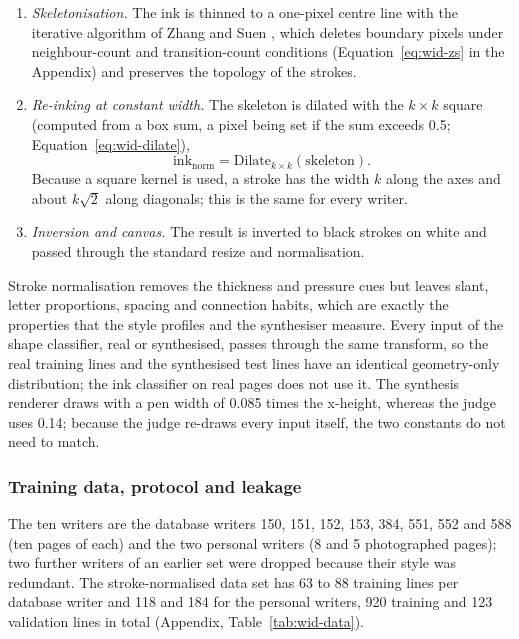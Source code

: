 \begin{enumerate}
\begin{equation}
w=\mathrm{clip}\bigl(\mathrm{round}(0.14\,x_h),\,2,\,9\bigr),\qquad k=2\lfloor w/2\rfloor+1,
\label{eq:wid-penw}
\end{equation}
where $k$ is the odd side of the structuring element that realises the width (for example $x_h=20$ gives $w=3$ and $k=3$).
\item \emph{Skeletonisation.} The ink is thinned to a one-pixel centre line with the iterative algorithm of Zhang and Suen \cite{zhang1984}, which deletes boundary pixels under neighbour-count and transition-count conditions (Equation~\ref{eq:wid-zs} in the Appendix) and preserves the topology of the strokes.
\item \emph{Re-inking at constant width.} The skeleton is dilated with the $k\times k$ square (computed from a box sum, a pixel being set if the sum exceeds 0.5; Equation~\ref{eq:wid-dilate}),
\begin{equation}
\mathrm{ink}_{\mathrm{norm}}=\mathrm{Dilate}_{k\times k}(\mathrm{skeleton}).
\label{eq:wid-dilate}
\end{equation}
Because a square kernel is used, a stroke has the width $k$ along the axes and about $k\sqrt2$ along diagonals; this is the same for every writer.
\item \emph{Inversion and canvas.} The result is inverted to black strokes on white and passed through the standard resize and normalisation.
\end{enumerate}


Stroke normalisation removes the thickness and pressure cues but leaves slant, letter proportions, spacing and connection habits, which are exactly the properties that the style profiles and the synthesiser measure.
Every input of the shape classifier, real or synthesised, passes through the same transform, so the real training lines and the synthesised test lines have an identical geometry-only distribution; the ink classifier on real pages does not use it.
The synthesis renderer draws with a pen width of 0.085 times the x-height, whereas the judge uses 0.14; because the judge re-draws every input itself, the two constants do not need to match.

\subsubsection{Training data, protocol and leakage}

The ten writers are the database writers 150, 151, 152, 153, 384, 551, 552 and 588 (ten pages of each) and the two personal writers (8 and 5 photographed pages); two further writers of an earlier set were dropped because their style was redundant.
The stroke-normalised data set has 63 to 88 training lines per database writer and 118 and 184 for the personal writers, 920 training and 123 validation lines in total (Appendix, Table~\ref{tab:wid-data}).

